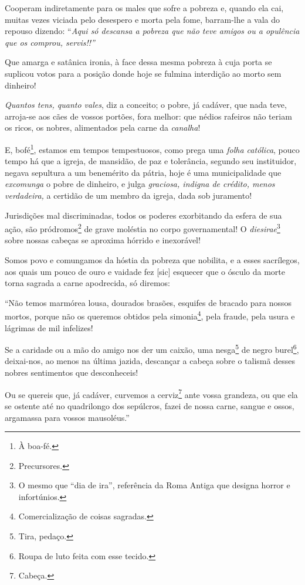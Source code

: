 Cooperam indiretamente para os males que sofre a pobreza e, quando ela
cai, muitas vezes viciada pelo desespero e morta pela fome, barram-lhe a
vala do repouso dizendo: ``\emph{Aqui só descansa a pobreza que não teve
amigos ou a opulência que os comprou, servis!!''}

Que amarga e satânica ironia, à face dessa mesma pobreza à cuja porta se
suplicou votos para a posição donde hoje se fulmina interdição ao morto
sem dinheiro!

\emph{Quantos tens, quanto vales}, diz a conceito; o pobre, já cadáver,
que nada teve, arroja-se aos cães de vossos portões, fora melhor: que
nédios rafeiros não teriam os ricos, os nobres, alimentados pela carne
da \emph{canalha}!

E, bofé\footnote{À boa-fé.}, estamos em tempos tempestuosos, como
prega uma \emph{folha católica}, pouco tempo há que a igreja, de
mansidão, de paz e tolerância, segundo seu instituidor, negava sepultura
a um benemérito da pátria, hoje é uma municipalidade que
\emph{excomunga} o pobre de dinheiro, e julga \emph{graciosa, indigna de
crédito, menos verdadeira,} a certidão de um membro da igreja, dada sob
juramento!

Jurisdições mal discriminadas, todos os poderes exorbitando da esfera de
sua ação, são pródromos\footnote{Precursores.} de grave moléstia no
corpo governamental! O \emph{diesirae}\footnote{O mesmo que ``dia de
  ira'', referência da Roma Antiga que designa horror e infortúnios.}
sobre nossas cabeças se aproxima hórrido e inexorável!

Somos povo e comungamos da hóstia da pobreza que nobilita, e a esses
sacrílegos, aos quais um pouco de ouro e vaidade fez {[}sic{]} esquecer
que o ósculo da morte torna sagrada a carne apodrecida, só diremos:

``Não temos marmórea lousa, dourados brasões, esquifes de bracado para
nossos mortos, porque não os queremos obtidos pela simonia\footnote{
  Comercialização de coisas sagradas.}, pela fraude, pela usura e
lágrimas de mil infelizes!

Se a caridade ou a mão do amigo nos der um caixão, uma nesga\footnote{
  Tira, pedaço.} de negro burel\footnote{Roupa de luto feita com esse
  tecido.}, deixai-nos, ao menos na última jazida, descançar a cabeça
sobre o talismã desses nobres sentimentos que desconheceis!

Ou se quereis que, já cadáver, curvemos a cerviz\footnote{Cabeça.}
ante vossa grandeza, ou que ela se ostente até no quadrilongo dos
sepúlcros, fazei de nossa carne, sangue e ossos, argamassa para vossos
mausoléus.''

